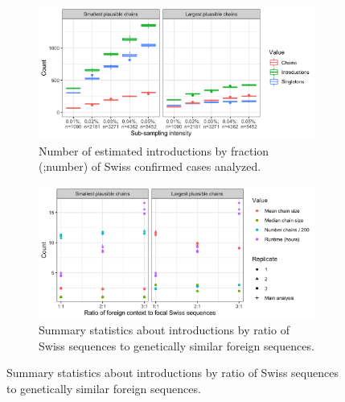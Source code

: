 \documentclass[9pt,twoside,lineno]{pnas-new}
\begin{document}
\begin{figure}[H]
\centering
\begin{subfigure}[b]{0.95\textwidth}
\centering
\includegraphics[width = 11.4cm]{figures/fig_SX_sensitivity_subsampling.png}
\caption{Number of estimated introductions by fraction (;number) of Swiss confirmed cases analyzed.}  
\end{subfigure}
\label{fig:sensitivity_downsampling}

\begin{subfigure}[b]{0.95\textwidth}
\centering
\includegraphics[width = 11.4cm]{figures/fig_SX_sensitivity_context_set_size.png}
\caption{Summary statistics about introductions by ratio of Swiss sequences to genetically similar foreign sequences.}  
\end{subfigure}
\label{fig:sensitivity_context_set_size}


\end{figure}
\end{document}
